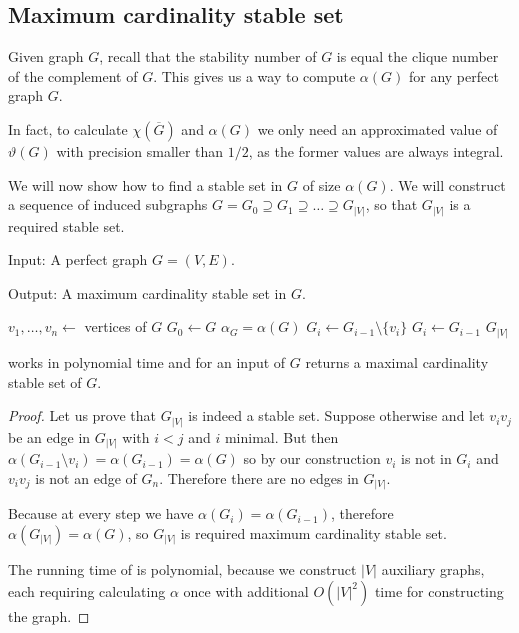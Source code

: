 \subsection{Maximum cardinality stable set}

Given graph $G$, recall that the stability number of $G$ is equal the clique number of the complement of $G$. This gives us a way to compute $\alpha(G)$ for any perfect graph $G$.

In fact, to calculate $\chi(\overline{G})$ and $\alpha(G)$ we only need an approximated value of $\vartheta(G)$ with precision smaller than $1/2$, as the former values are always integral.

We will now show how to find a stable set in $G$ of size $\alpha(G)$. We will construct a sequence of induced subgraphs $G = G_0 \supseteq G_1 \supseteq \ldots \supseteq G_{|V|}$, so that $G_{|V|}$ is a required stable set.

\begin{alg}
  \label{alg:maxStableSet}
  Input: A perfect graph $G = (V, E)$.

  \noindent Output: A maximum cardinality stable set in $G$.
\end{alg}

\begin{algorithmic}[1]
  \ls $v_1, \ldots, v_n \gets$ vertices of $G$
  \ls $G_0 \leftarrow G$
  \ls $\alpha_G = \alpha(G)$
      \ls $G_i \leftarrow G_{i-1} \setminus \{v_i\}$
    \mElse
      \ls $G_i \leftarrow G_{i-1}$
    \mEndIf
  \mEndFor
  \ls \RETURN $G_{|V|}$
  \mEndProcedure
\end{algorithmic}

\begin{theorem}
   works in polynomial time and for an input of $G$ returns a maximal cardinality stable set of $G$.
\end{theorem}
\begin{proof}
  Let us prove that $G_{|V|}$ is indeed a stable set. Suppose otherwise and let $v_iv_j$ be an edge in $G_{|V|}$ with $i < j$ and $i$ minimal. But then $\alpha(G_{i-1} \setminus v_i) = \alpha(G_{i-1}) = \alpha(G)$ so by our construction $v_i$ is not in $G_i$ and $v_iv_j$ is not an edge of $G_n$. Therefore there are no edges in $G_{|V|}$.

  Because at every step we have $\alpha(G_i) = \alpha(G_{i-1})$, therefore $\alpha(G_{|V|}) = \alpha(G)$, so $G_{|V|}$ is required maximum cardinality stable set.
  
  The running time of  is polynomial, because we construct $|V|$ auxiliary graphs, each requiring calculating $\alpha$ once with additional $O(|V|^2)$ time for constructing the graph.
\end{proof}

